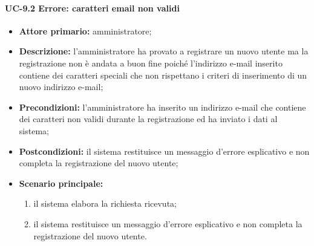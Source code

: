     \paragraph{UC-9.2 Errore: caratteri email non validi}
    \begin{itemize}
        \item \textbf{Attore primario:} amministratore;
    
        \item \textbf{Descrizione:} l'amministratore ha provato a registrare un nuovo utente ma la registrazione non è andata a buon fine poiché l'indirizzo e-mail inserito contiene dei caratteri speciali che non rispettano i criteri di inserimento di un nuovo indirizzo e-mail;
    
        \item \textbf{Precondizioni:} l'amministratore ha inserito un indirizzo e-mail che contiene dei caratteri non validi durante la registrazione ed ha inviato i dati al sistema;
    
        \item \textbf{Postcondizioni:} il sistema restituisce un messaggio d'errore esplicativo e non completa la registrazione del nuovo utente;
    
        \item \textbf{Scenario principale:}
              \begin{enumerate}
                  \item il sistema elabora la richiesta ricevuta;
                  \item il sistema restituisce un messaggio d'errore esplicativo e non completa la registrazione del nuovo utente.
              \end{enumerate}
    \end{itemize}

